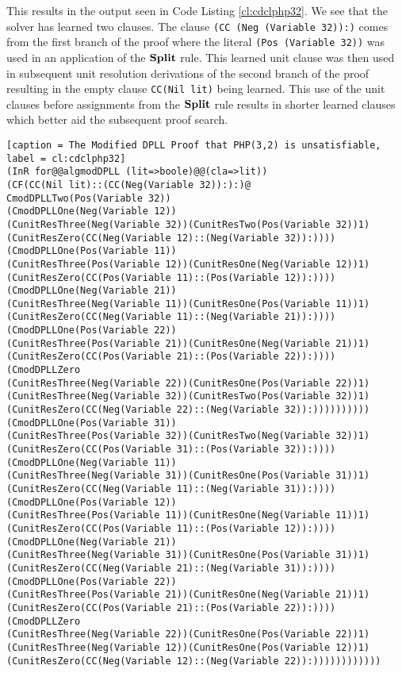 This results in the output seen in Code Listing \ref{cl:cdclphp32}.  We see that the solver has learned two clauses. The clause \texttt{(CC (Neg (Variable 32)):)} comes from the first branch of the proof where the literal \texttt{(Pos (Variable 32))} was used in an application of the $\mathbf{Split}$ rule. This learned unit clause was then used in subsequent unit resolution derivations of the second branch of the proof resulting in the empty clause \texttt{CC(Nil lit)} being learned.  This use of the unit clauses before assignments from the $\mathbf{Split}$ rule results in shorter learned clauses which better aid the subsequent proof search.
\newpage
\begin{lstlisting}[caption = The Modified DPLL Proof that PHP(3,2) is unsatisfiable, label = cl:cdclphp32] 
(InR for@@algmodDPLL (lit=>boole)@@(cla=>lit))
(CF(CC(Nil lit)::(CC(Neg(Variable 32)):):)@
CmodDPLLTwo(Pos(Variable 32))
(CmodDPLLOne(Neg(Variable 12))
(CunitResThree(Neg(Variable 32))(CunitResTwo(Pos(Variable 32))1)
(CunitResZero(CC(Neg(Variable 12)::(Neg(Variable 32)):))))
(CmodDPLLOne(Pos(Variable 11))
(CunitResThree(Pos(Variable 12))(CunitResOne(Neg(Variable 12))1)
(CunitResZero(CC(Pos(Variable 11)::(Pos(Variable 12)):))))
(CmodDPLLOne(Neg(Variable 21))
(CunitResThree(Neg(Variable 11))(CunitResOne(Pos(Variable 11))1)
(CunitResZero(CC(Neg(Variable 11)::(Neg(Variable 21)):))))
(CmodDPLLOne(Pos(Variable 22))
(CunitResThree(Pos(Variable 21))(CunitResOne(Neg(Variable 21))1)
(CunitResZero(CC(Pos(Variable 21)::(Pos(Variable 22)):))))
(CmodDPLLZero
(CunitResThree(Neg(Variable 22))(CunitResOne(Pos(Variable 22))1)
(CunitResThree(Neg(Variable 32))(CunitResTwo(Pos(Variable 32))1)
(CunitResZero(CC(Neg(Variable 22)::(Neg(Variable 32)):))))))))))
(CmodDPLLOne(Pos(Variable 31))
(CunitResThree(Pos(Variable 32))(CunitResTwo(Neg(Variable 32))1)
(CunitResZero(CC(Pos(Variable 31)::(Pos(Variable 32)):))))
(CmodDPLLOne(Neg(Variable 11))
(CunitResThree(Neg(Variable 31))(CunitResOne(Pos(Variable 31))1)
(CunitResZero(CC(Neg(Variable 11)::(Neg(Variable 31)):))))
(CmodDPLLOne(Pos(Variable 12))
(CunitResThree(Pos(Variable 11))(CunitResOne(Neg(Variable 11))1)
(CunitResZero(CC(Pos(Variable 11)::(Pos(Variable 12)):))))
(CmodDPLLOne(Neg(Variable 21))
(CunitResThree(Neg(Variable 31))(CunitResOne(Pos(Variable 31))1)
(CunitResZero(CC(Neg(Variable 21)::(Neg(Variable 31)):))))
(CmodDPLLOne(Pos(Variable 22))
(CunitResThree(Pos(Variable 21))(CunitResOne(Neg(Variable 21))1)
(CunitResZero(CC(Pos(Variable 21)::(Pos(Variable 22)):))))
(CmodDPLLZero
(CunitResThree(Neg(Variable 22))(CunitResOne(Pos(Variable 22))1)
(CunitResThree(Neg(Variable 12))(CunitResOne(Pos(Variable 12))1)
(CunitResZero(CC(Neg(Variable 12)::(Neg(Variable 22)):))))))))))))
\end{lstlisting}


